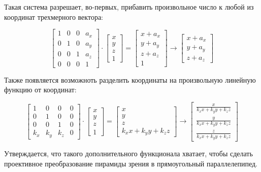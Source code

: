 \documentclass{article}
\begin{document}
Такая система разрешает, во-первых, прибавить произвольное число к любой из координат трехмерного вектора:

$$\begin{bmatrix} 1 & 0 & 0 & a_x \\ 0 & 1 & 0 & a_y \\ 0 & 0 & 1 & a_z \\ 0 & 0 & 0 & 1\end{bmatrix} \cdot\begin{bmatrix} x \\ y \\ z \\ 1 \end{bmatrix} = \begin{bmatrix} x + a_x \\ y + a_y \\ z + a_z \\ 1 \end{bmatrix} \to \begin{bmatrix} x + a_x \\ y + a_y \\ z + a_z \end{bmatrix}$$

Также появляется возможноть разделить координаты на произвольную линейную функцию от координат:

$$\begin{bmatrix} 1 & 0 & 0 & 0 \\ 0 & 1 & 0 & 0 \\ 0 & 0 & 1 & 0 \\ k_x & k_y & k_z & 0\end{bmatrix} \cdot\begin{bmatrix} x \\ y \\ z \\ 1 \end{bmatrix} = \begin{bmatrix} x \\ y \\ z \\ k_xx + k_yy + k_zz\end{bmatrix} \to \begin{bmatrix}\frac{x}{k_xx + k_yy + k_zz} \\\frac{y}{k_xx + k_yy + k_zz} \\\frac{z}{k_xx + k_yy + k_zz} \end{bmatrix}$$

Утверждается, что такого дополнительного функционала хватает, чтобы сделать проективное преобразование пирамиды зрения в прямоугольный параллелепипед.
\end{document}
